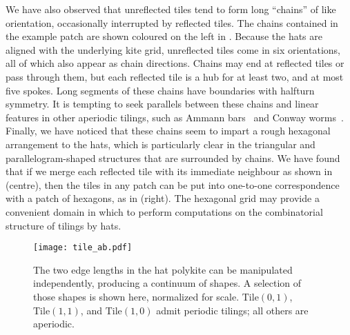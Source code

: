 We have also observed that unreflected tiles tend to form long
``chains'' of like orientation, occasionally interrupted by reflected
tiles.  The chains contained in the example patch are shown coloured
on the left in .  Because the hats are aligned
with the underlying kite grid, unreflected tiles come in six
orientations, all of which also appear as chain directions.  Chains
may end at reflected tiles or pass through them, but each reflected
tile is a hub for at least two, and at most five spokes.  
Long segments of these chains have boundaries with halfturn symmetry.
It is tempting to seek parallels between these chains and linear
features in other aperiodic tilings, such as Ammann bars~\cite[Section
10.6]{GS} and Conway worms~\cite[Section 10.5]{GS}.
Finally, we have noticed that these chains seem to impart a rough
hexagonal arrangement to the hats, which is particularly clear in the
triangular and parallelogram-shaped structures that are surrounded
by chains.  We have found that if we merge each reflected tile with its
immediate neighbour as shown in  (centre), then the
tiles in any patch can be put into one-to-one correspondence with a 
patch of hexagons, as in  (right).  The hexagonal grid
may provide a convenient domain in which to perform computations on the
combinatorial structure of tilings by hats.

\begin{figure}[htp!]
\begin{center}
\texttt{[image: tile\_ab.pdf]}
\end{center}
\caption{\label{fig:tile_ab}The two edge lengths in the hat polykite
	can be manipulated independently, producing a continuum of shapes.
	A selection of those shapes is shown here, normalized for scale.
	$\mathrm{Tile}(0,1)$, $\mathrm{Tile}(1,1)$, and $\mathrm{Tile}(1,0)$ 
	admit periodic tilings; all others are aperiodic.}
\end{figure}

